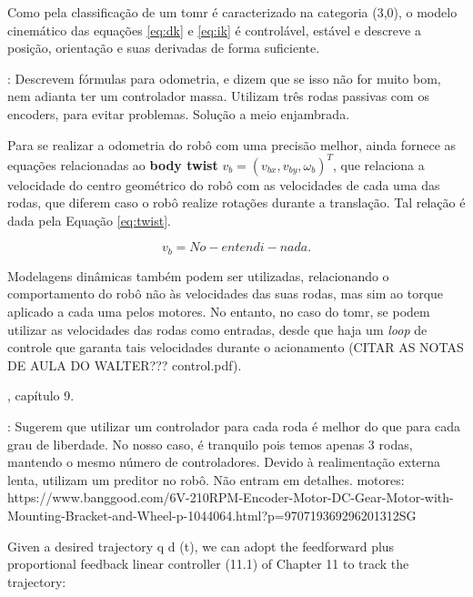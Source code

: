 Como pela classificação de \cite{campion1996structural} um \acrshort{tomr} é caracterizado na categoria (3,0), o modelo cinemático das equações \ref{eq:dk} e \ref{eq:ik} é controlável, estável e descreve a posição, orientação e suas derivadas de forma suficiente. %

\cite{samani2007comprehensive}: Descrevem fórmulas para odometria, e dizem que se isso não for muito bom, nem adianta ter um controlador massa. Utilizam três rodas passivas com os encoders, para evitar problemas. Solução a meio enjambrada.

Para se realizar a odometria do robô com uma precisão melhor, \cite{lynch2017modern} ainda fornece as equações relacionadas ao \textbf{body twist} $v_b = (v_{bx}, v_{by}, \omega_b)^T$, que relaciona a velocidade do centro geométrico do robô com as velocidades de cada uma das rodas, que diferem caso o robô realize rotações durante a translação. Tal relação é dada pela Equação \ref{eq:twist}.

\begin{equation}
  v_b = No-entendi-nada.
  \label{eq:twist}
\end{equation}

Modelagens dinâmicas também podem ser utilizadas, relacionando o comportamento do robô não às velocidades das suas rodas, mas sim ao torque aplicado a cada uma pelos motores. No entanto, no caso do \acrshort{tomr}, se podem utilizar as velocidades das rodas como entradas, desde que haja um \emph{loop} de controle que garanta tais velocidades durante o acionamento (CITAR AS NOTAS DE AULA DO WALTER??? control.pdf).

\cite{lynch2017modern}, capítulo 9.

\cite{rojas2006holonomic}: Sugerem que utilizar um controlador para cada roda é melhor do que para cada grau de liberdade. No nosso caso, é tranquilo pois temos apenas 3 rodas, mantendo o mesmo número de controladores. Devido à realimentação externa lenta, utilizam um preditor no robô. Não entram em detalhes.
motores:
https://www.banggood.com/6V-210RPM-Encoder-Motor-DC-Gear-Motor-with-Mounting-Bracket-and-Wheel-p-1044064.html?p=970719369296201312SG

Given a desired trajectory q d (t), we can adopt the feedforward plus proportional feedback linear controller (11.1) of Chapter 11 to track the trajectory: \cite{lynch2017modern}

